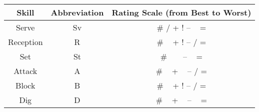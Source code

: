 \begin{tabular}{ccc}
  Skill     & Abbreviation  & Rating Scale (from Best to Worst)\\
  \hline
  Serve     & Sv            & \# \quad / \quad + \quad ! \quad -- \quad ~ \quad =\\
  Reception & R             & \# \quad ~ \quad + \quad ! \quad -- \quad / \quad =\\
  Set       & St            & \# \quad ~ \quad {\color{white}+} \quad ~ \quad -- \quad ~ \quad =\\
  Attack    & A             & \# \quad ~ \quad + \quad ~ \quad -- \quad / \quad =\\
  Block     & B             & \# \quad ~ \quad + \quad ! \quad -- \quad / \quad =\\
  Dig       & D             & \# \quad ~ \quad + \quad ~ \quad -- \quad ~ \quad =\\
\end{tabular}